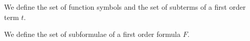
\begin{definition}
	We define 	
	the set of function symbols
	and the set of subterms
of a first order term $t$.
	
\end{definition}

\begin{definition}
	We define 
	the set of subformulae
of a first order formula $F$.
\end{definition}




